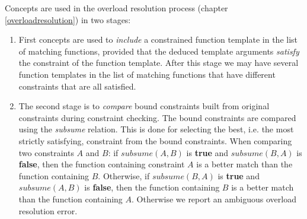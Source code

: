 \documentclass[a4paper,oneside,11pt]{book}
\theoremstyle{definition}
\begin{document}
Concepts are used in the overload resolution process (chapter \ref{overloadresolution}) in two stages:

\begin{enumerate}
\item
First concepts are used to \emph{include} a constrained function template in the list of matching functions, provided
that the deduced template arguments \emph{satisfy} the constraint of the function template.
After this stage we may have several function templates in the list of matching functions that have different constraints that are all satisfied.

\item
The second stage is to \emph{compare} bound constraints built from original constraints during constraint checking.
The bound constraints are compared using the \emph{subsume} relation.
This is done for selecting the best, i.e. the most strictly satisfying, constraint from the bound constraints.
When comparing two constraints $A$ and $B$: if $subsume(A, B)$ is \textbf{true} and $subsume(B, A)$ is \textbf{false},
then the function containing constraint $A$ is a better match than the function containing $B$.
Otherwise, if $subsume(B, A)$ is \textbf{true} and $subsume(A, B)$ is \textbf{false},
then the function containing $B$ is a better match than the function containing $A$.
Otherwise we report an ambiguous overload resolution error.
\end{enumerate}
\end{document}
